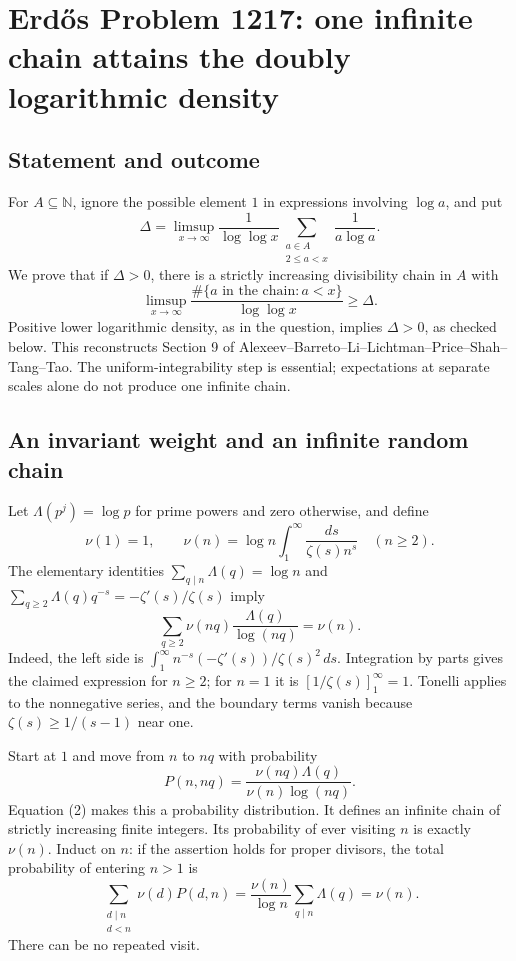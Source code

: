 \section*{Erd\H{o}s Problem 1217: one infinite chain attains the doubly logarithmic density}
\subsection*{Statement and outcome}
For $A\subseteq\mathbb N$, ignore the possible element $1$ in expressions involving $\log a$, and put
\[
 \Delta=\limsup_{x\to\infty}\frac1{\log\log x}
              \sum_{\substack{a\in A\\2\le a<x}}\frac1{a\log a}.
\]
We prove that if $\Delta>0$, there is a strictly increasing divisibility chain in $A$ with
\[
 \limsup_{x\to\infty}\frac{\#\{a\text{ in the chain}:a<x\}}{\log\log x}\ge\Delta.
 \tag{1}
\]
Positive lower logarithmic density, as in the question, implies $\Delta>0$, as checked below. This reconstructs Section 9 of Alexeev--Barreto--Li--Lichtman--Price--Shah--Tang--Tao. The uniform-integrability step is essential; expectations at separate scales alone do not produce one infinite chain.

\subsection*{An invariant weight and an infinite random chain}
Let $\Lambda(p^j)=\log p$ for prime powers and zero otherwise, and define
\[
 \nu(1)=1,\qquad
 \nu(n)=\log n\int_1^\infty\frac{ds}{\zeta(s)n^s}\quad(n\ge2).
\]
The elementary identities
$\sum_{q\mid n}\Lambda(q)=\log n$ and
$\sum_{q\ge2}\Lambda(q)q^{-s}=-\zeta'(s)/\zeta(s)$ imply
\[
 \sum_{q\ge2}\nu(nq)\frac{\Lambda(q)}{\log(nq)}=\nu(n).
 \tag{2}
\]
Indeed, the left side is
$\int_1^\infty n^{-s}(-\zeta'(s))/\zeta(s)^2\,ds$.
Integration by parts gives the claimed expression for $n\ge2$; for $n=1$ it is
$[1/\zeta(s)]_1^\infty=1$. Tonelli applies to the nonnegative series, and the boundary terms vanish because $\zeta(s)\ge1/(s-1)$ near one.

Start at $1$ and move from $n$ to $nq$ with probability
\[
 P(n,nq)=\frac{\nu(nq)\Lambda(q)}{\nu(n)\log(nq)}.
\]
Equation (2) makes this a probability distribution. It defines an infinite chain of strictly increasing finite integers. Its probability of ever visiting $n$ is exactly $\nu(n)$. Induct on $n$: if the assertion holds for proper divisors, the total probability of entering $n>1$ is
\[
 \sum_{\substack{d\mid n\\d<n}}\nu(d)P(d,n)
 =\frac{\nu(n)}{\log n}\sum_{q\mid n}\Lambda(q)=\nu(n).
 \tag{3}
\]
There can be no repeated visit.

